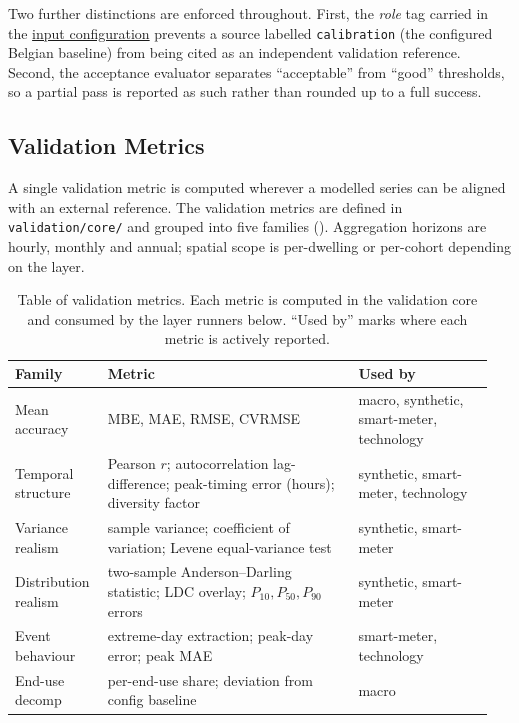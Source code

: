 Two further distinctions are enforced throughout. First, the \emph{role} tag carried in the \hyperref[sec:dataProcessing]{input configuration} prevents a source labelled \texttt{calibration} (the configured Belgian baseline) from being cited as an independent validation reference. Second, the acceptance evaluator separates ``acceptable'' from ``good'' thresholds, so a partial pass is reported as such rather than rounded up to a full success.


\subsection{Validation Metrics}
\label{sec:validationMetrics}

A single validation metric is computed wherever a modelled series can be aligned with an external reference. The validation metrics are defined in \texttt{validation/core/} and grouped into five families (). Aggregation horizons are hourly, monthly and annual; spatial scope is per-dwelling or per-cohort depending on the layer.

\begin{table}[ht]
  \centering
  \footnotesize
  \caption{Table of validation metrics. Each metric is computed in the validation core and consumed by the layer runners below. ``Used by'' marks where each metric is actively reported.}
  \label{tab:validation_metrics}
  \begin{tabular}{@{}p{0.18\linewidth} p{0.50\linewidth} p{0.27\linewidth}@{}}
    \toprule
    \textbf{Family} & \textbf{Metric} & \textbf{Used by} \\
    \midrule
    Mean accuracy
      & MBE, MAE, RMSE, CVRMSE
      & macro, synthetic, smart-meter, technology \\
    Temporal structure
      & Pearson $r$; autocorrelation lag-difference;
        peak-timing error (hours); diversity factor
      & synthetic, smart-meter, technology \\
    Variance realism
      & sample variance; coefficient of variation;
        Levene equal-variance test
      & synthetic, smart-meter \\
    Distribution realism
      & two-sample Anderson--Darling statistic;
        LDC overlay; $P_{10}, P_{50}, P_{90}$ errors
      & synthetic, smart-meter \\
    Event behaviour
      & extreme-day extraction; peak-day error; peak MAE
      & smart-meter, technology \\
    End-use decomp
      & per-end-use share; deviation from config baseline
      & macro \\
    \bottomrule
  \end{tabular}
\end{table}

